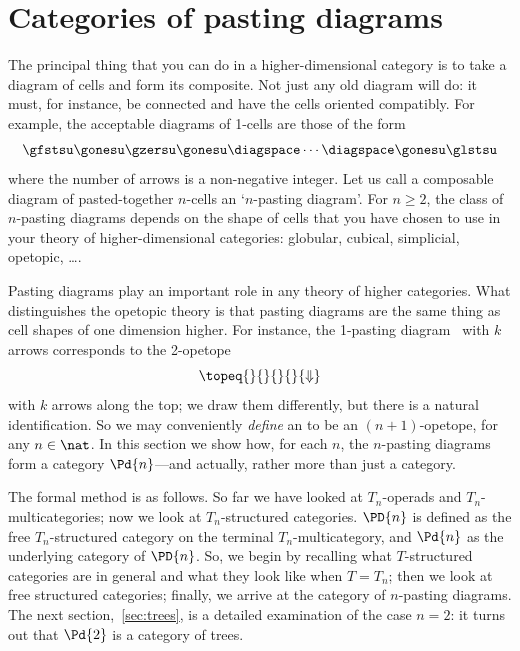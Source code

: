 \section{Categories of pasting diagrams}

The principal thing that you can do in a higher-dimensional category is to
take a diagram of cells and form its composite.  Not just any old diagram
will do: it must, for instance, be connected and have the cells oriented
compatibly.  For example, the acceptable diagrams of 1-cells are those of
the form
%
\begin{equation}	\label{diag:ope-one-pd}
\gfstsu\gonesu\gzersu\gonesu 
\diagspace \cdots \diagspace 
\gonesu\glstsu
\end{equation}
%
where the number of arrows is a non-negative integer.  Let us call a
composable diagram of pasted-together $n$-cells an `$n$-pasting%
%
%
diagram'.
For $n\geq 2$, the class of $n$-pasting diagrams depends on the shape of
cells that you have chosen to use in your theory of higher-dimensional
categories: globular, cubical, simplicial, opetopic, \ldots.

Pasting diagrams play an important role in any theory of higher categories.
What distinguishes the opetopic theory is that pasting diagrams are the
same thing as cell shapes of one dimension higher.  For instance, the
1-pasting diagram~ with $k$ arrows corresponds to the
2-opetope
\[
\topeq{}{}{}{}{\Downarrow}
\]
with $k$ arrows along the top; we draw them differently, but there is a
natural identification.  So we may conveniently \emph{define} an
%
%
%
to be an $(n+1)$-opetope, for any
$n\in\nat$.  In this section we show how, for each $n$, the $n$-pasting
diagrams form a category $\Pd{n}$---and actually, rather more than just a
category.  

The formal method is as follows.  So far we have looked at $T_n$-operads
and $T_n$-multicategories; now we look at $T_n$-structured%
%
%
categories.
$\PD{n}$ is defined as the free $T_n$-structured category on the terminal
$T_n$-multicategory, and $\Pd{n}$ as the underlying category of $\PD{n}$.
So, we begin by recalling what $T$-structured categories are in general and
what they look like when $T=T_n$; then we look at free structured
categories; finally, we arrive at the category of $n$-pasting diagrams.
The next section,~\ref{sec:trees}, is a detailed examination of the case
$n=2$: it turns out that $\Pd{2}$ is a category of trees.

